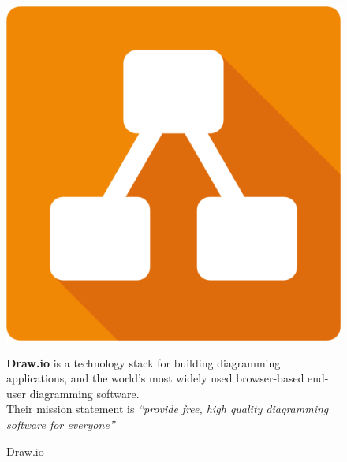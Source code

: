 \begin{figure}[h]
\centering
\begin{minipage}{0.3\textwidth}
    \centering
    \includegraphics[width=\linewidth,frame]{figures/drawio.png}
    \caption{Draw.io}
\end{minipage}
\hfill
\begin{minipage}{0.6\textwidth}
    \textbf{Draw.io} is a technology stack for building diagramming applications, and the world’s most widely used browser-based end-user diagramming software.\\Their mission statement is \textit{“provide free, high quality diagramming software for everyone”}\cite{samplewebs9}
\end{minipage}
\end{figure}


